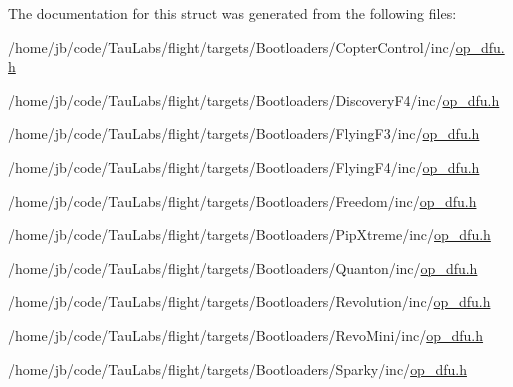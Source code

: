 \-The documentation for this struct was generated from the following files\-:\begin{DoxyCompactItemize}
\item 
/home/jb/code/\-Tau\-Labs/flight/targets/\-Bootloaders/\-Copter\-Control/inc/\hyperlink{_copter_control_2inc_2op__dfu_8h}{op\-\_\-dfu.\-h}\item 
/home/jb/code/\-Tau\-Labs/flight/targets/\-Bootloaders/\-Discovery\-F4/inc/\hyperlink{_discovery_f4_2inc_2op__dfu_8h}{op\-\_\-dfu.\-h}\item 
/home/jb/code/\-Tau\-Labs/flight/targets/\-Bootloaders/\-Flying\-F3/inc/\hyperlink{_flying_f3_2inc_2op__dfu_8h}{op\-\_\-dfu.\-h}\item 
/home/jb/code/\-Tau\-Labs/flight/targets/\-Bootloaders/\-Flying\-F4/inc/\hyperlink{_flying_f4_2inc_2op__dfu_8h}{op\-\_\-dfu.\-h}\item 
/home/jb/code/\-Tau\-Labs/flight/targets/\-Bootloaders/\-Freedom/inc/\hyperlink{_freedom_2inc_2op__dfu_8h}{op\-\_\-dfu.\-h}\item 
/home/jb/code/\-Tau\-Labs/flight/targets/\-Bootloaders/\-Pip\-Xtreme/inc/\hyperlink{_pip_xtreme_2inc_2op__dfu_8h}{op\-\_\-dfu.\-h}\item 
/home/jb/code/\-Tau\-Labs/flight/targets/\-Bootloaders/\-Quanton/inc/\hyperlink{_quanton_2inc_2op__dfu_8h}{op\-\_\-dfu.\-h}\item 
/home/jb/code/\-Tau\-Labs/flight/targets/\-Bootloaders/\-Revolution/inc/\hyperlink{_revolution_2inc_2op__dfu_8h}{op\-\_\-dfu.\-h}\item 
/home/jb/code/\-Tau\-Labs/flight/targets/\-Bootloaders/\-Revo\-Mini/inc/\hyperlink{_revo_mini_2inc_2op__dfu_8h}{op\-\_\-dfu.\-h}\item 
/home/jb/code/\-Tau\-Labs/flight/targets/\-Bootloaders/\-Sparky/inc/\hyperlink{_sparky_2inc_2op__dfu_8h}{op\-\_\-dfu.\-h}\end{DoxyCompactItemize}
